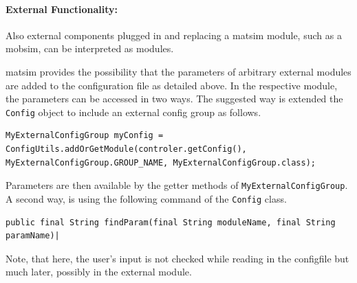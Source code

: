 %
%



\paragraph{External Functionality:} %
Also external components plugged in and replacing a \gls{matsim} module, such as a \gls{mobsim}, can be interpreted as modules.

\gls{matsim} provides the possibility that the parameters of arbitrary external modules are added to the configuration file as detailed above. In the respective module, the parameters can be accessed in two ways. The suggested way is extended the \lstinline|Config| object to include an external config group as follows.
%
\begin{lstlisting}
MyExternalConfigGroup myConfig = ConfigUtils.addOrGetModule(controler.getConfig(), MyExternalConfigGroup.GROUP_NAME, MyExternalConfigGroup.class);
\end{lstlisting}
%
Parameters are then available by the getter methods of \lstinline|MyExternalConfigGroup|. A second way, is using the following command of the \lstinline|Config| class.
\begin{lstlisting}
public final String findParam(final String moduleName, final String paramName)| 
\end{lstlisting}
Note, that here, the user's input is not checked while reading in the \gls{configfile} but much later, possibly in the external module.

